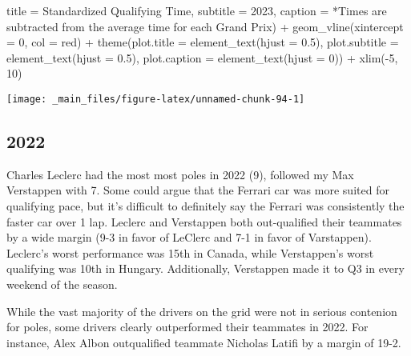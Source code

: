 \documentclass[
]{book}
\newenvironment{Shaded}{\begin{snugshade}}{\end{snugshade}}
\newcommand{\AttributeTok}[1]{\textcolor[rgb]{0.77,0.63,0.00}{#1}}
\newcommand{\DecValTok}[1]{\textcolor[rgb]{0.00,0.00,0.81}{#1}}
\newcommand{\FloatTok}[1]{\textcolor[rgb]{0.00,0.00,0.81}{#1}}
\newcommand{\FunctionTok}[1]{\textcolor[rgb]{0.00,0.00,0.00}{#1}}
\newcommand{\NormalTok}[1]{#1}
\newcommand{\SpecialCharTok}[1]{\textcolor[rgb]{0.00,0.00,0.00}{#1}}
\newcommand{\StringTok}[1]{\textcolor[rgb]{0.31,0.60,0.02}{#1}}
\begin{document}
\begin{Shaded}
\begin{Highlighting}[]
       \AttributeTok{title =} \StringTok{\textquotesingle{}Standardized Qualifying Time\textquotesingle{}}\NormalTok{,}
       \AttributeTok{subtitle =} \StringTok{\textquotesingle{}2023\textquotesingle{}}\NormalTok{,}
       \AttributeTok{caption =} \StringTok{\textquotesingle{}*Times are subtracted from the average time for each Grand Prix\textquotesingle{}}\NormalTok{) }\SpecialCharTok{+}
  \FunctionTok{geom\_vline}\NormalTok{(}\AttributeTok{xintercept =} \DecValTok{0}\NormalTok{, }\AttributeTok{col =} \StringTok{\textquotesingle{}red\textquotesingle{}}\NormalTok{) }\SpecialCharTok{+}
  \FunctionTok{theme}\NormalTok{(}\AttributeTok{plot.title =} \FunctionTok{element\_text}\NormalTok{(}\AttributeTok{hjust =} \FloatTok{0.5}\NormalTok{),}
        \AttributeTok{plot.subtitle =} \FunctionTok{element\_text}\NormalTok{(}\AttributeTok{hjust =} \FloatTok{0.5}\NormalTok{),}
        \AttributeTok{plot.caption =} \FunctionTok{element\_text}\NormalTok{(}\AttributeTok{hjust =} \DecValTok{0}\NormalTok{)) }\SpecialCharTok{+}
  \FunctionTok{xlim}\NormalTok{(}\SpecialCharTok{{-}}\DecValTok{5}\NormalTok{, }\DecValTok{10}\NormalTok{)}
\end{Highlighting}
\end{Shaded}

\begin{center}\texttt{[image: \_main\_files/figure-latex/unnamed-chunk-94-1]} \end{center}

\hypertarget{section-1}{%
\subsection{2022}\label{section-1}}

Charles Leclerc had the most most poles in 2022 (9), followed my Max Verstappen with 7. Some could argue that the Ferrari car was more suited for qualifying pace, but it's difficult to definitely say the Ferrari was consistently the faster car over 1 lap. Leclerc and Verstappen both out-qualified their teammates by a wide margin (9-3 in favor of LeClerc and 7-1 in favor of Varstappen). Leclerc's worst performance was 15th in Canada, while Verstappen's worst qualifying was 10th in Hungary. Additionally, Verstappen made it to Q3 in every weekend of the season.

While the vast majority of the drivers on the grid were not in serious contenion for poles, some drivers clearly outperformed their teammates in 2022. For instance, Alex Albon outqualified teammate Nicholas Latifi by a margin of 19-2.
\end{document}
